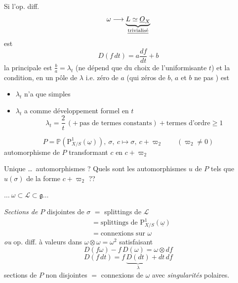\documentclass[11pt,a4paper]{article}
\begin{document}
Si l'op. diff.
\[
\omega \longrightarrow \underbrace{L \simeq \underline{O}_X}_{\text{\uncertain{trivialisé}}}
\]
est
\[
D(f\,dt) = a\frac{df}{dt} + b
\]
la   principale est $\frac{b}{a} = \lambda_t$ (ne dépend que du choix de l'uniformisante $t$) et la condition, en un pôle de $\lambda$ i.e. zéro de $a$ (qui      zéros de $b$,  $a$ et $b$ ne  pas  ) est
\begin{itemize}
\item[a)] $\lambda_t$ n'a que  simples
\item[b)] \struck{\ill{}} $\lambda_t$ a comme développement formel en $t$
\[
\lambda_t = \frac{2}{t}\,(+\ \text{pas de termes constants}) + \text{termes d'ordre} \geq 1
\]
\end{itemize}



\[
P = \mathbb{P}(\mathrm{P}^1_{X/S}(\underline{\omega})),\ \sigma,\ c
\longmapsto \sigma,\ c + \varpi_2 \qquad (\varpi_2 \neq 0)
\]
automorphisme de $P$ transformant $c$ en $c+\varpi_2$

 Unique \ldots\ automorphismes ? Quels sont les automorphismes $u$ de $P$ tels que $u(\sigma)$ \uncertain{\ill{}} de la forme $c+\varpi_2$ ??

$\ldots\ \omega \subset \mathcal{L} \subset \mathfrak{g}\ldots$

\emph{Sections de $P$} disjointes de $\sigma$ $=$ splittings de $\mathcal{L}$
\[
\begin{aligned}
&= \text{splittings de } \mathrm{P}^1_{X/S}(\underline{\omega})\\
&= \text{connexions sur } \omega
\end{aligned}
\]
\emph{ou} op. diff.    à valeurs dans $\omega\otimes\omega = \omega^2$  satisfaisant
\[
D(f\omega) - f\,D(\omega) = \omega\otimes df
\]
\[
D(f\,dt) = f\,\underbrace{D(dt)}_{\lambda} + dt\,df
\]
sections de $P$ non disjointes  $=$ connexions de $\omega$ avec  \emph{singularités} polaires.
\end{document}
